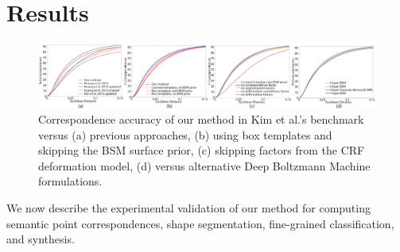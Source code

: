 \section{Results}
\label{sec:results_applications}

\begin{figure}[t!]
\hskip -3mm
\includegraphics[width=1.03\textwidth]{figures/CORRECTED_correspondence_all.pdf}
\vskip -3mm
\caption{Correspondence accuracy of our method in Kim et al.'s benchmark versus (a) previous approaches, (b) using box templates and skipping the BSM surface prior, (c) skipping factors from the CRF deformation model, (d) versus alternative Deep Boltzmann Machine formulations.}
\vskip -8mm
\label{fig:correspondence_accuracy_all}
\end{figure}

We now describe the experimental validation of our method for computing semantic point correspondences, shape segmentation, fine-grained classification, and synthesis.

